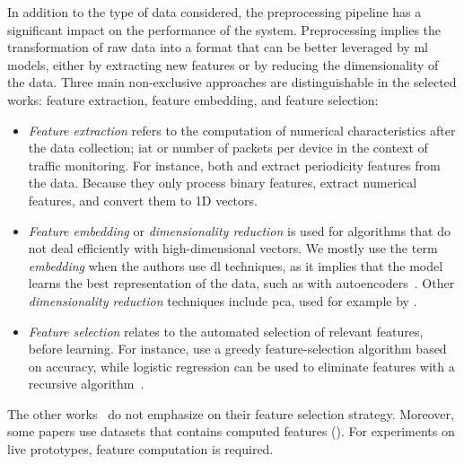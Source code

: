 In addition to the type of data considered, the preprocessing pipeline has a significant impact on the performance of the system.
Preprocessing implies the transformation of raw data into a format that can be better leveraged by \gls{ml} models, either by extracting new features or by reducing the dimensionality of the data.
Three main non-exclusive approaches are distinguishable in the selected works: feature extraction, feature embedding, and feature selection:
\begin{itemize}
  \item \emph{Feature extraction} refers to the computation of numerical characteristics after the data collection; \eg \gls{iat} or number of packets per device in the context of traffic monitoring.
  For instance, both \textcite{nguyen_DIoTFederatedSelflearning_2019} and \textcite{pahl_AllEyesYou_2018} extract periodicity features from the data.
  Because they only process binary features, \textcite{qin_LineSpeedScalableIntrusion_2020a} extract numerical features, and convert them to 1D vectors.
  
  \item \emph{Feature embedding} or \emph{dimensionality reduction} is used for algorithms that do not deal efficiently with high-dimensional vectors.
  We mostly use the term \emph{embedding} when the authors use \gls{dl} techniques, as it implies that the model learns the best representation of the data, such as with autoencoders~\cite{chen_Networkanomalydetection_2020}.
  Other \emph{dimensionality reduction} techniques include \gls{pca}, used for example by \textcite{kim_CollaborativeAnomalyDetection_2020}.

  \item \emph{Feature selection} relates to the automated selection of relevant features, before learning.
  For instance, \textcite{qin_FederatedLearningBasedNetwork_2021} use a greedy feature-selection algorithm based on accuracy, while logistic regression can be used to eliminate features with a recursive algorithm~\cite{al-athbaal-marri_FederatedMimicLearning_2020}.
\end{itemize}

The other works~\cite{zhang_BlockchainbasedFederatedLearning_2020,schneble_Attackdetectionusing_2019,li_DeepFedFederatedDeep_2020,rathore_BlockSecIoTNetBlockchainbaseddecentralized_2019} do not emphasize on their feature selection strategy.
Moreover, some papers \cite{li_DeepFedFederatedDeep_2020,schneble_Attackdetectionusing_2019,zhao_MultiTaskNetworkAnomaly_2019} use datasets that contains computed features ().
For experiments on live prototypes, feature computation is required.

